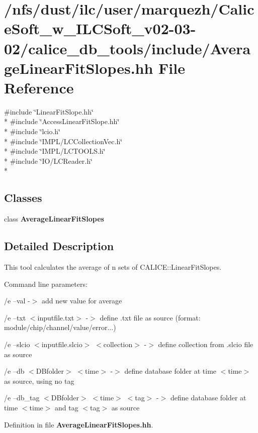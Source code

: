 \section{/nfs/dust/ilc/user/marquezh/\-Calice\-Soft\-\_\-w\-\_\-\-I\-L\-C\-Soft\-\_\-v02-\/03-\/02/calice\-\_\-db\-\_\-tools/include/\-Average\-Linear\-Fit\-Slopes.hh File Reference}
\label{AverageLinearFitSlopes_8hh}
{\ttfamily \#include \char`\"{}Linear\-Fit\-Slope.\-hh\char`\"{}}\\*
{\ttfamily \#include \char`\"{}Access\-Linear\-Fit\-Slope.\-hh\char`\"{}}\\*
{\ttfamily \#include \char`\"{}lcio.\-h\char`\"{}}\\*
{\ttfamily \#include \char`\"{}I\-M\-P\-L/\-L\-C\-Collection\-Vec.\-h\char`\"{}}\\*
{\ttfamily \#include \char`\"{}I\-M\-P\-L/\-L\-C\-T\-O\-O\-L\-S.\-h\char`\"{}}\\*
{\ttfamily \#include \char`\"{}I\-O/\-L\-C\-Reader.\-h\char`\"{}}\\*
\subsection*{Classes}
\begin{DoxyCompactItemize}
\item 
class {\bf Average\-Linear\-Fit\-Slopes}
\end{DoxyCompactItemize}


\subsection{Detailed Description}
This tool calculates the average of n sets of C\-A\-L\-I\-C\-E\-::\-Linear\-Fit\-Slopes.

Command line parameters\-:\par
\par
 /e --val -\/$>$ add new value for average\par
\par
 /e --txt $<$inputfile.\-txt$>$ -\/$>$ define .txt file as source (format\-: module/chip/channel/value/error...)\par
 /e --slcio $<$inputfile.\-slcio$>$ $<$collection$>$ -\/$>$ define collection from .slcio file as source\par
 /e --db $<$D\-Bfolder$>$ $<$time$>$ -\/$>$ define database folder at time $<$time$>$ as source, using no tag\par
 /e --db\-\_\-tag $<$D\-Bfolder$>$ $<$time$>$ $<$tag$>$ -\/$>$ define database folder at time $<$time$>$ and tag $<$tag$>$ as source\par


Definition in file {\bf Average\-Linear\-Fit\-Slopes.\-hh}.


